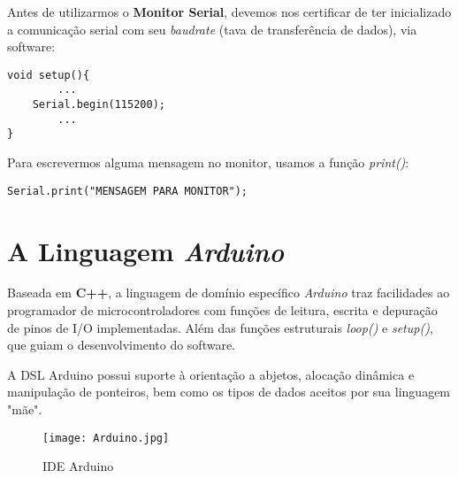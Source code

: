 \documentclass[
	11pt,				%
	openright,			%
	twoside,			%
	a5paper,			%
	english,			%
	french,				%
	spanish,			%
	brazil,				%
	sumario=tradicional
]{abntex2}
\begin{document}
    \vspace{5pt}
    
    \begin{tcolorbox}[colbacktitle=green!50!white!60,
title={\vspace{-13pt}\texttt{[image: notebook.png]} \hspace{2pt} \textsf{\textbf{Na Prática...}\vspace{4pt}}},coltitle=black, colback=white,arc=4mm, outer arc=3.5mm]
\raggedright
    
    Antes de utilizarmos o \textbf{\textsf{Monitor Serial}}, devemos nos certificar de ter inicializado a comunicação serial com seu \textit{baudrate} (tava de transferência de dados), via software:
    
    \begin{lstlisting}
void setup(){
        ...
    Serial.begin(115200);
        ...
}
    \end{lstlisting}
    
    Para escrevermos alguma mensagem no monitor, usamos a função \emph{print()}:
    
    \begin{lstlisting}
Serial.print("MENSAGEM PARA MONITOR");
    \end{lstlisting}
    
\end{tcolorbox}



\section{A Linguagem \textit{Arduino}}
\label{sec:arduino}
Baseada em \textbf{\textsf{C++}}, a linguagem de domínio específico \textit{Arduino} traz facilidades ao programador de microcontroladores com funções de leitura, escrita e depuração de pinos de I/O implementadas. Além das funções estruturais \emph{loop()} e \emph{setup()}, que guiam o desenvolvimento do software.

A DSL Arduino possui suporte à orientação a abjetos, alocação dinâmica e manipulação de ponteiros, bem como os tipos de dados aceitos por sua linguagem "mãe".

\begin{figure}[b]
    \centering
    \texttt{[image: Arduino.jpg]}
    \caption{IDE Arduino}
    \label{IDE}
\end{figure}
\end{document}

